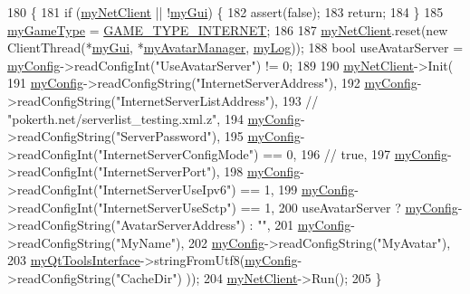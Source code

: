 \begin{DoxyCode}
180 \{
181     \textcolor{keywordflow}{if} (\hyperlink{class_session_a767e3250d6a14be4c2b86d1e2dfa7b3c}{myNetClient} || !\hyperlink{class_session_a2725f4b56b109b2e7d75ed780d24fa6d}{myGui}) \{
182         assert(\textcolor{keyword}{false});
183         \textcolor{keywordflow}{return};
184     \}
185     \hyperlink{class_session_acf11b7b3982bc3e4c5bbf635d5e98496}{myGameType} = \hyperlink{class_session_a6989c72d21ad19fd7abbd1c8d95d78c1adb35dec5c0038852cb94ffbd5c5739f2}{GAME\_TYPE\_INTERNET};
186 
187     \hyperlink{class_session_a767e3250d6a14be4c2b86d1e2dfa7b3c}{myNetClient}.reset(\textcolor{keyword}{new} ClientThread(*\hyperlink{class_session_a2725f4b56b109b2e7d75ed780d24fa6d}{myGui}, *\hyperlink{class_session_a53231528d2b4c4babd97c7d1194a5f7e}{myAvatarManager}, 
      \hyperlink{class_session_a1d2dd8533f3c551a5c18211f22d380f8}{myLog}));
188     \textcolor{keywordtype}{bool} useAvatarServer = \hyperlink{class_session_a5bfbe43c623b688e7def57e02704033f}{myConfig}->readConfigInt(\textcolor{stringliteral}{"UseAvatarServer"}) != 0;
189 
190     \hyperlink{class_session_a767e3250d6a14be4c2b86d1e2dfa7b3c}{myNetClient}->Init(
191         \hyperlink{class_session_a5bfbe43c623b688e7def57e02704033f}{myConfig}->readConfigString(\textcolor{stringliteral}{"InternetServerAddress"}),
192         \hyperlink{class_session_a5bfbe43c623b688e7def57e02704033f}{myConfig}->readConfigString(\textcolor{stringliteral}{"InternetServerListAddress"}),
193 \textcolor{comment}{//      "pokerth.net/serverlist\_testing.xml.z",}
194         \hyperlink{class_session_a5bfbe43c623b688e7def57e02704033f}{myConfig}->readConfigString(\textcolor{stringliteral}{"ServerPassword"}),
195         \hyperlink{class_session_a5bfbe43c623b688e7def57e02704033f}{myConfig}->readConfigInt(\textcolor{stringliteral}{"InternetServerConfigMode"}) == 0,
196 \textcolor{comment}{//      true,}
197         \hyperlink{class_session_a5bfbe43c623b688e7def57e02704033f}{myConfig}->readConfigInt(\textcolor{stringliteral}{"InternetServerPort"}),
198         \hyperlink{class_session_a5bfbe43c623b688e7def57e02704033f}{myConfig}->readConfigInt(\textcolor{stringliteral}{"InternetServerUseIpv6"}) == 1,
199         \hyperlink{class_session_a5bfbe43c623b688e7def57e02704033f}{myConfig}->readConfigInt(\textcolor{stringliteral}{"InternetServerUseSctp"}) == 1,
200         useAvatarServer ? \hyperlink{class_session_a5bfbe43c623b688e7def57e02704033f}{myConfig}->readConfigString(\textcolor{stringliteral}{"AvatarServerAddress"}) : \textcolor{stringliteral}{""},
201         \hyperlink{class_session_a5bfbe43c623b688e7def57e02704033f}{myConfig}->readConfigString(\textcolor{stringliteral}{"MyName"}),
202         \hyperlink{class_session_a5bfbe43c623b688e7def57e02704033f}{myConfig}->readConfigString(\textcolor{stringliteral}{"MyAvatar"}),
203         \hyperlink{class_session_a1827a0341223eafa3859f249e73ebd38}{myQtToolsInterface}->stringFromUtf8(\hyperlink{class_session_a5bfbe43c623b688e7def57e02704033f}{myConfig}->readConfigString(\textcolor{stringliteral}{"CacheDir"})
      ));
204     \hyperlink{class_session_a767e3250d6a14be4c2b86d1e2dfa7b3c}{myNetClient}->Run();
205 \}
\end{DoxyCode}
